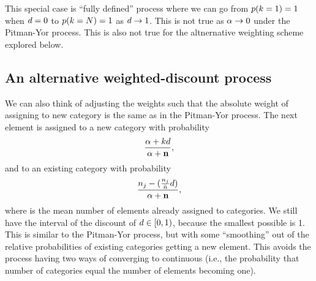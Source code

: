 This special case is ``fully defined'' process where we can
go from $p(k = 1) = 1$ when $d = 0$ to
$p(k = N) = 1$ as $d \to 1$.
This is not true as $\alpha \to 0$ under the Pitman-Yor process.
This is also not true for the altnernative weighting scheme explored below.


\subsection{An alternative weighted-discount process}

We can also think of adjusting the weights such that the absolute weight of
assigning to new category is the same as in the Pitman-Yor process.
The next element is assigned to
a new category with probability
\begin{equation}
    \frac{\concentration + \numcats\discount}{\concentration + \numassignedtotal},
    \label{eq:pywdprobnew}
\end{equation}
and to an existing category with probability
\begin{equation}
    \frac{\numassigned[\catindex] - (\frac{\numassigned[\catindex]}{\numassignedmean}\discount)}{\concentration + \numassignedtotal},
    \label{eq:pywdprobexisting}
\end{equation}
where \numassignedmean is the mean number of elements already assigned to
categories.  We still have the interval of the discount of $d \in [0,
1)$, because the smallest possible \numassignedmean is 1.
This is similar to the Pitman-Yor process, but with some ``smoothing'' out of
the relative probabilities of existing categories getting a new element.
This avoids the process having two ways of converging to continuous
(i.e., the probability that number of categories equal the number of
elements becoming one).
